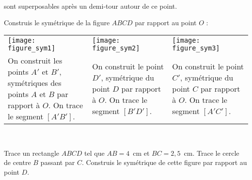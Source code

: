 \begin{methode*1}

\begin{aconnaitre}
 sont superposables après un demi-tour autour de ce point. 
\end{aconnaitre}

\begin{exemple*1}
Construis le symétrique de la figure $ABCD$ par rapport au point $O$ : \\[0.5em]
\begin{tabularx}{\textwidth}{X|X|X}
 \texttt{[image: figure\_sym1]} &  \texttt{[image: figure\_sym2]} & \texttt{[image: figure\_sym3]} \\ 
 On construit les points $A'$ et $B'$, symétriques des points $A$ et $B$ par rapport à $O$. On trace le segment $[A'B']$. & On construit  le point $D'$, symétrique du point $D$ par rapport à $O$. On trace le segment $[B'D']$. & On construit le point $C'$, symétrique du point $C$ par rapport à $O$. On trace le segment $[A'C']$. \\
\end{tabularx} \\
 \end{exemple*1}


\exercice
Trace un rectangle $ABCD$ tel que $AB = 4$ cm et $BC = 2,5$ cm. Trace le cercle de centre $B$ passant par $C$. Construis le symétrique de cette figure par rapport au point $D$.
 
\end{methode*1}


